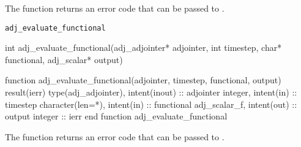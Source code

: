 The function returns an error code that can be passed to .


\begin{boxwithtitle}{\texttt{adj_evaluate_functional}}
\begin{minipage}{\columnwidth}
\begin{ccode}
  int adj_evaluate_functional(adj_adjointer* adjointer, int timestep, 
                              char* functional, adj_scalar* output)
\end{ccode}
\begin{fortrancode}   
  function adj_evaluate_functional(adjointer, timestep, functional, output) 
           result(ierr)
    type(adj_adjointer), intent(inout) :: adjointer
    integer, intent(in) :: timestep
    character(len=*), intent(in) :: functional
    adj_scalar_f, intent(out) :: output
    integer :: ierr
  end function adj_evaluate_functional
\end{fortrancode}
\end{minipage}
\end{boxwithtitle}

The function returns an error code that can be passed to .


